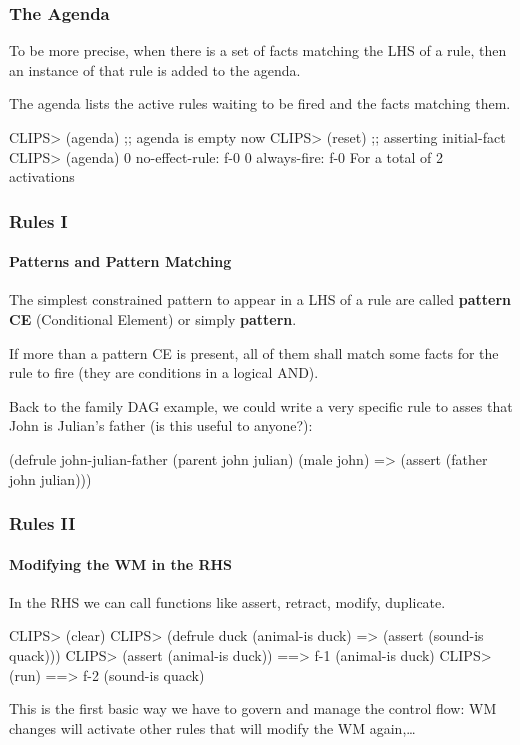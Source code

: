 \documentclass[xcolor={usenames,dvipsnames,svgnames}, compress]{beamer}
\begin{document}
\begin{frame}[fragile]
  \frametitle{The Agenda}
  To be more precise, when there is a set of facts matching the LHS of
  a rule, then an instance of that rule is added to the
  \textsf{agenda}.\par\bigskip
  The agenda lists the active rules waiting to be fired and the facts
  matching them.
  \begin{clips-code}[firstnumber=7]
    CLIPS> (agenda) ;; agenda is empty now
    CLIPS> (reset)  ;; asserting initial-fact
    CLIPS> (agenda)
    0      no-effect-rule: f-0
    0      always-fire: f-0
    For a total of 2 activations
  \end{clips-code}
  
\end{frame}

\begin{frame}[fragile]
  \frametitle{Rules I}
  \framesubtitle{Patterns and Pattern Matching}
  The simplest constrained pattern to appear in a LHS of a rule are called \textbf{pattern
    CE} (Conditional Element) or simply \textbf{pattern}.\par\bigskip

  If more than a pattern CE is present, all of them shall match some
  facts for the rule to fire (they are conditions in a logical AND).\par\bigskip

  Back to the family DAG example, we could write a very specific rule
  to asses that John is Julian's father (is this useful to anyone?):
  \begin{clips-code}[numbers=none]
    (defrule john-julian-father
        (parent john julian)
        (male john)
        =>
        (assert (father john julian)))
  \end{clips-code}
\end{frame}

\begin{frame}[fragile]
  \frametitle{Rules II}
  \framesubtitle{Modifying the WM in the RHS}
  In the RHS we can call functions like \textsf{assert}, \textsf{retract}, \textsf{modify}, \textsf{duplicate}.
  \begin{clips-code}
    CLIPS> (clear)
    CLIPS> (defrule duck
               (animal-is duck)
               =>
               (assert (sound-is quack)))
    CLIPS> (assert (animal-is duck))
    ==> f-1 (animal-is duck)
    CLIPS> (run)
    ==> f-2 (sound-is quack)
  \end{clips-code}
  This is the first basic way we have to govern and manage the control
  flow: WM changes will activate other rules that will modify the WM again,\dots
\end{frame}
\end{document}
